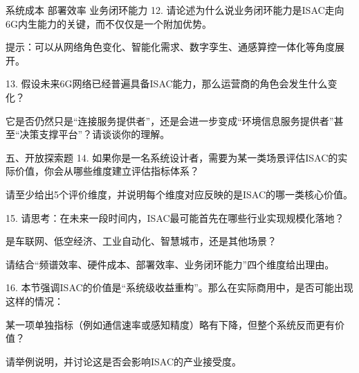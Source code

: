 系统成本
部署效率
业务闭环能力
12. 请论述为什么说业务闭环能力是ISAC走向6G内生能力的关键，而不仅仅是一个附加优势。

提示：可以从网络角色变化、智能化需求、数字孪生、通感算控一体化等角度展开。

13. 假设未来6G网络已经普遍具备ISAC能力，那么运营商的角色会发生什么变化？

它是否仍然只是“连接服务提供者”，还是会进一步变成“环境信息服务提供者”甚至“决策支撑平台”？请谈谈你的理解。

五、开放探索题
14. 如果你是一名系统设计者，需要为某一类场景评估ISAC的实际价值，你会从哪些维度建立评估指标体系？

请至少给出5个评价维度，并说明每个维度对应反映的是ISAC的哪一类核心价值。

15. 请思考：在未来一段时间内，ISAC最可能首先在哪些行业实现规模化落地？

是车联网、低空经济、工业自动化、智慧城市，还是其他场景？

请结合“频谱效率、硬件成本、部署效率、业务闭环能力”四个维度给出理由。

16. 本节强调ISAC的价值是“系统级收益重构”。那么在实际商用中，是否可能出现这样的情况：

某一项单独指标（例如通信速率或感知精度）略有下降，但整个系统反而更有价值？

请举例说明，并讨论这是否会影响ISAC的产业接受度。